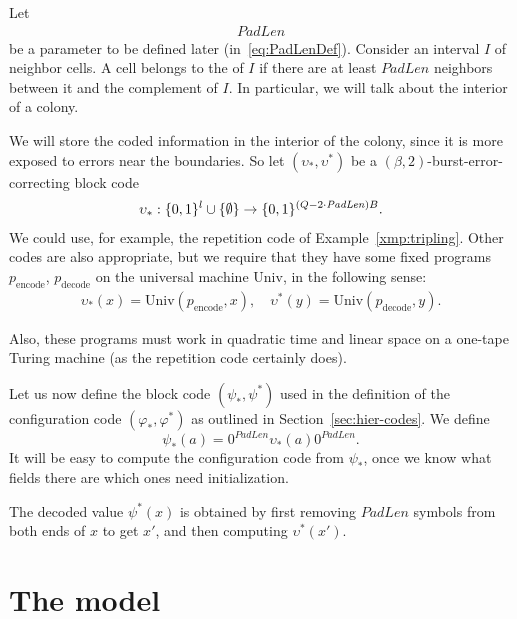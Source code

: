 \documentclass[11pt]{memoir}
\theoremstyle{definition} %
\def\B{B}
\newcommand{\Q}{Q}
\newcommand{\decode}{\mathrm{decode}}
\newcommand{\encode}{\mathrm{encode}}
\newcommand{\PadLen}{\mathit{PadLen}}
\newcommand{\Un}{\mathrm{Univ}}
\begin{document}
\begin{definition}[Interior]\label{def:interior}
Let 
\begin{align*}
  \PadLen 
\end{align*}
be a parameter to be defined later (in~\eqref{eq:PadLenDef}).
Consider an interval \( I \) of neighbor cells.
A cell belongs to the  of \( I \) if there are at least \( \PadLen \) neighbors between it 
and the complement of \( I \).
In particular, we will talk about the interior of a colony.
\end{definition}

We will store the coded information in the interior of the colony, since it is more exposed 
to errors near the boundaries.
So let \( (\upsilon_{*}, \upsilon^{*}) \) be a \( (\beta,2) \)-burst-error-correcting block code
\begin{align*}
  \upsilon_{*}: \{0,1\}^{l} \cup \set{\emptyset}
   \to\{0,1\}^{(\Q-2\cdot\PadLen)\B}.
\end{align*}
We could use, for example, the repetition code of Example~\ref{xmp:tripling}.
Other codes are also appropriate, but we require that they have some fixed
programs \( p_{\encode} \), \( p_{\decode} \)
on the universal machine \( \Un \), in the following sense:
 \begin{align*}
   \upsilon_{*}(x)=\Un(p_{\encode},x),\quad
   \upsilon^{*}(y)=\Un(p_{\decode}, y).
 \end{align*}

Also, these programs must work in quadratic time and linear space on a one-tape
Turing machine (as the repetition code certainly does).

Let us now define the block code \( (\psi_{*}, \psi^{*}) \) used in the
definition of the configuration code \( (\varphi_{*}, \varphi^{*}) \) as 
outlined in Section~\ref{sec:hier-codes}.
We define
\begin{equation}\label{eq:psi}
   \psi_{*}(a)  = 0^{\PadLen}\upsilon_{*}(a)0^{\PadLen}.
\end{equation}
It will be easy to compute the configuration code from \( \psi_{*} \),
once we know what fields there are which ones need initialization.

The decoded value \( \psi^{*}(x) \) is obtained by first removing \( \PadLen \)
symbols from both ends of \( x \) to get \( x' \), and then computing \(
\upsilon^{*}(x') \).


\section{The model}\label{sec:model}
\end{document}
